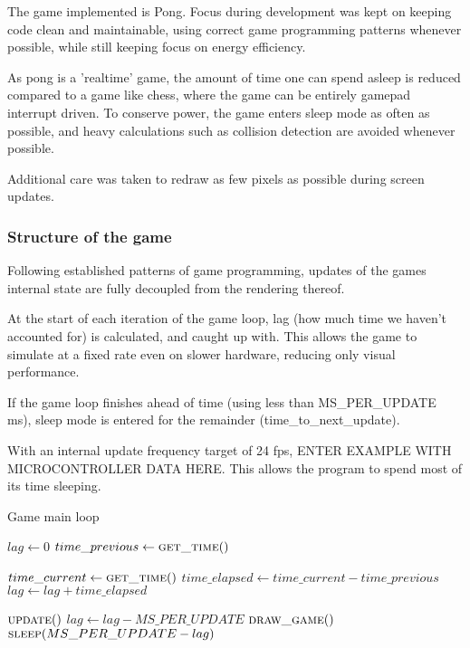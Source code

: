 The game implemented is Pong. Focus during development was kept on keeping code
clean and maintainable, using correct game programming patterns whenever
possible, while still keeping focus on energy efficiency.

As pong is a 'realtime' game, the amount of time one can spend asleep is
reduced compared to a game like chess, where the game can be entirely gamepad
interrupt driven.  To conserve power, the game enters sleep mode as often as
possible, and heavy calculations such as collision detection are avoided
whenever possible.

Additional care was taken to redraw as few pixels as possible during screen
updates.

\subsubsection{Structure of the game}

Following established patterns of game programming, updates of the games
internal state are fully decoupled from the rendering thereof.

At the start of each iteration of the game loop, lag (how much time we haven't
accounted for) is calculated, and caught up with.  This allows the game to
simulate at a fixed rate even on slower hardware, reducing only visual
performance.

If the game loop finishes ahead of time (using less than MS\_PER\_UPDATE ms),
sleep mode is entered for the remainder (time\_to\_next\_update).

With an internal update frequency target of 24 fps, ENTER EXAMPLE WITH
MICROCONTROLLER DATA HERE.  This allows the program to spend most of its time
sleeping.

\begin{algorithm}
  \caption{Game main loop}
  \begin{algorithmic}
    \State $lag \gets 0$
    \State $time\_previous \gets \Call{get\_time}{\null}$

    \Loop
      \State $time\_current \gets \Call{get\_time}{\null}$
      \State $time\_elapsed \gets time\_current - time\_previous$
      \State $lag \gets lag + time\_elapsed$

        \State $\Call{update}{\null}$
        \State $lag \gets lag - MS\_PER\_UPDATE$
      \EndWhile
      \State $\Call{draw\_game}{\null}$
      \State $\Call{sleep}{MS\_PER\_UPDATE - lag}$
    \EndLoop
  \end{algorithmic}
\end{algorithm}

